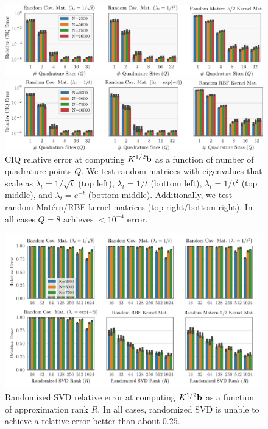 \begin{figure}[t!]
	\centering
	\includegraphics[width=\textwidth]{figures/quad_error.pdf}

	\includegraphics[width=\textwidth]{figures/quad_error_supp.pdf}
  \caption[
    Relative error of CIQ as a function of number of quadrature points $Q$.
  ]{
    CIQ relative error at computing $K^{1/2} \mathbf{b}$ as a function of number of quadrature points $Q$.
    We test random matrices with eigenvalues that scale as $\lambda_t = 1/\sqrt{t}$ (top left), $\lambda_t = 1/t$ (bottom left), $\lambda_t = 1/{t}^2$ (top middle), and $\lambda_t = e^{-t}$ (bottom middle).
    Additionally, we test random Mat\'ern/RBF kernel matrices (top right/bottom right).
    In all cases $Q=8$ achieves $<10^{-4}$ error.
  }
  \label{fig:quad_error}
\end{figure}

\begin{figure}[ht!]
	\centering
	\includegraphics[width=\textwidth]{figures/randomized_svd_error_supp.pdf}
  \caption{
    Randomized SVD relative error at computing $K^{1/2} \mathbf{b}$ as a function of approximation rank $R$.
    In all cases, randomized SVD is unable to achieve a relative error better than about $0.25$.
  }
  \label{fig:randomized_svd_supp}
\end{figure}

